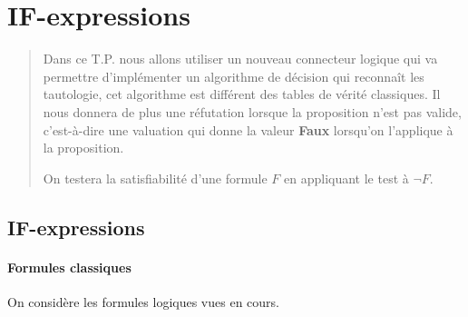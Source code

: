 \def\V{\text{\sc Vrai}\,}
\def\F{\text{\sc Faux}\,}
\def\ite{\text{\sc ite}\,}
\chapter{IF-expressions}
\thispagestyle{empty}
\begin{abstract}
Dans ce T.P. nous allons utiliser un nouveau connecteur logique qui va permettre d'implémenter un algorithme de décision qui reconnaît les tautologie, cet algorithme est différent des tables de vérité classiques. Il nous donnera de plus une réfutation lorsque la proposition n'est pas valide, c'est-à-dire une valuation qui donne la valeur {\bf Faux} lorsqu'on l'applique à la proposition.


On testera la satisfiabilité d'une formule $F$ en appliquant le test à $\neg F$.
\end{abstract}
\section{IF-expressions}
\subsubsection*{Formules classiques}

On considère les formules logiques vues en cours.


